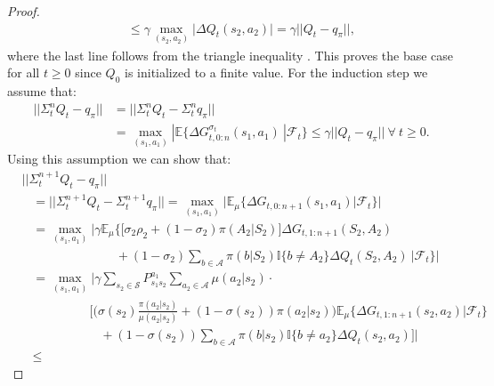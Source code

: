 \begin{proof}
\begin{align*}
& \hspace{10pt} 
	\leq \gamma \max_{(s_2, a_2)} \big| \Delta Q_t(s_2, a_2) \big| = \gamma || Q_t - q_\pi ||,
\end{align*}
%
where the last line follows from the triangle inequality . 
This proves the base case for all $t \geq 0$ since $Q_0$ is initialized to a finite value.
For the induction step we assume that:
%
\begin{align*}
|| \Sigma^n_t Q_t - q_\pi ||  & = || \Sigma^n_t Q_t - \Sigma^n_t q_\pi  || 
    \\
	&= \max_{(s_1,a_1)} | \mathbb{E} \Big\{ \Delta G^{\sigma_t}_{t, 0:n} (s_1, a_1) \ | \mathcal{F}_t \Big\} 
    \leq \gamma || Q_t - q_\pi || \ \forall \ t \geq 0.
\end{align*}
%
Using this assumption we can show that:
%
\begin{align*}
& || \Sigma^{n+1}_t Q_t - q_\pi || 
    \\
& \hspace{10pt} = 
    || \Sigma^{n+1}_t Q_t - \Sigma^{n+1}_t q_\pi ||
	= \max_{(s_1,a_1)} \big| \mathbb{E}_\mu \big\{ \Delta G_{t, 0:n+1} (s_1, a_1) \big| \mathcal{F}_t \big\} \big|
	\\
& \hspace{10pt} =
	\max_{(s_1, a_1)} \Big| \gamma \mathbb{E}_\mu \Big\{ 
    \big[ \sigma_{2} \rho_{2} + (1 - \sigma_{2}) \pi(A_2| S_2) \big] 
    \Delta G_{t, 1:n+1} (S_2, A_2)
    \\
& \hspace{90pt}
	+ (1 - \sigma_{2}) \sum_{b \in \mathcal{A}} \pi( b | S_2 ) 
    \mathbb{I}\{ b \neq A_2 \} \Delta Q_t ( S_2, A_2 ) 
    \ \big| \mathcal{F}_t \Big\} \Big| 
    \\
& \hspace{10pt} =
	\max_{(s_1, a_1)} \Big| \gamma
    \sum_{s_2 \in \mathcal{S}} P^{a_1}_{s_1 s_2} \sum_{a_2 \in \mathcal{A}} \mu(a_2 | s_2) \cdot
    \\
& \hspace{65pt}
    \Big[ \Big( \sigma(s_2) \frac{\pi( a_2 | s_2 )}{\mu( a_2 | s_2 )}
    + (1 - \sigma(s_2) ) \pi(a_2 | s_2) \Big) 
    \mathbb{E}_\mu \big\{\Delta G_{t, 1:n+1}( s_2, a_2 ) \big| \mathcal{F}_t \big\}
    \\
& \hspace{75pt}
	+ (1 - \sigma(s_2) ) \sum_{ b \in \mathcal{A} } \pi(b | s_2)
    \mathbb{I}\{ b \neq a_2 \} \Delta Q_t (s_2, a_2)
    \Big]
    \Big|
    \\
& \hspace{10pt} \leq

\end{align*}
\end{proof}
